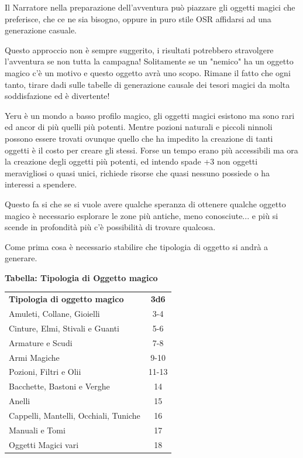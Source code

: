 \begin{multicols}{2}

	Il Narratore nella preparazione dell'avventura può piazzare gli oggetti magici che preferisce, che ce ne sia bisogno, oppure in puro stile OSR affidarsi ad una generazione casuale.

	Questo approccio non è sempre suggerito, i risultati potrebbero stravolgere l'avventura se non tutta la campagna! Solitamente se un "nemico" ha un oggetto magico c'è un motivo e questo oggetto avrà uno scopo. Rimane il fatto che ogni tanto, tirare dadi sulle tabelle di generazione causale dei tesori magici da molta soddisfazione ed è divertente!

	\begin{changemargin}{0.3cm}{0.3cm}\begin{narratore}   %
			Yeru è un mondo a basso profilo magico, gli oggetti magici esistono ma sono rari ed ancor di più quelli più potenti. Mentre pozioni naturali e piccoli ninnoli possono essere trovati ovunque quello che ha impedito la creazione di tanti oggetti è il costo per creare gli stessi. Forse un tempo erano più accessibili ma ora la creazione degli oggetti più potenti, ed intendo spade +3 non oggetti meravigliosi o quasi unici, richiede risorse che quasi nessuno possiede o ha interessi a spendere.

			Questo fa si che se si vuole avere qualche speranza di ottenere qualche oggetto magico è necessario esplorare le zone più antiche, meno conosciute... e più si scende in profondità più c'è possibilità di trovare qualcosa.
	\end{narratore}\end{changemargin}

	Come prima cosa è necessario stabilire che tipologia di oggetto si andrà a generare.

	\medskip

	\textbf{Tabella: Tipologia di Oggetto magico}

	\medskip

	\begin{tabular}{lc}
		\textbf{Tipologia di oggetto magico}&\textbf{3d6}\\
		Amuleti, Collane, Gioielli&3-4\\
		Cinture, Elmi, Stivali e Guanti&5-6\\
		Armature e Scudi&7-8\\
		Armi Magiche&9-10\\
		Pozioni, Filtri e Olii&11-13\\
		Bacchette, Bastoni e Verghe&14\\
		Anelli&15\\
		Cappelli, Mantelli, Occhiali, Tuniche&16\\
		Manuali e Tomi&17\\
		Oggetti Magici vari&18\\
	\end{tabular}


\end{multicols}
